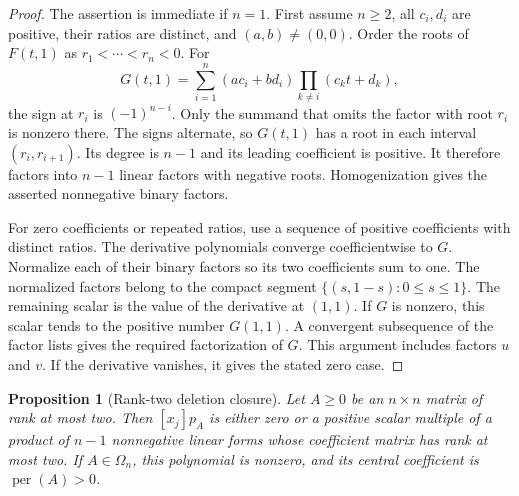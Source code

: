 \documentclass[11pt,a4paper]{article}
\newtheorem{proposition}[theorem]{Proposition}
\theoremstyle{definition}
\theoremstyle{remark}
\newcommand{\per}{\operatorname{per}}
\begin{document}
\begin{proof}
The assertion is immediate if $n=1$.
First assume $n\ge2$, all $c_i,d_i$ are positive, their ratios are distinct, and $(a,b)\ne(0,0)$.
Order the roots of $F(t,1)$ as $r_1<\cdots<r_n<0$.
For
\[
 G(t,1)=\sum_{i=1}^n(ac_i+bd_i)\prod_{k\ne i}(c_k t+d_k),
\]
the sign at $r_i$ is $(-1)^{n-i}$.
Only the summand that omits the factor with root $r_i$ is nonzero there.
The signs alternate, so $G(t,1)$ has a root in each interval $(r_i,r_{i+1})$.
Its degree is $n-1$ and its leading coefficient is positive.
It therefore factors into $n-1$ linear factors with negative roots.
Homogenization gives the asserted nonnegative binary factors.

For zero coefficients or repeated ratios, use a sequence of positive coefficients with distinct ratios.
The derivative polynomials converge coefficientwise to $G$.
Normalize each of their binary factors so its two coefficients sum to one.
The normalized factors belong to the compact segment
$\{(s,1-s):0\le s\le1\}$.
The remaining scalar is the value of the derivative at $(1,1)$.
If $G$ is nonzero, this scalar tends to the positive number $G(1,1)$.
A convergent subsequence of the factor lists gives the required factorization of $G$.
This argument includes factors $u$ and $v$.
If the derivative vanishes, it gives the stated zero case.
\end{proof}

\begin{proposition}[Rank-two deletion closure]\label{prop:r2-deletion-closure}
Let $A\ge0$ be an $n\times n$ matrix of rank at most two.
Then $[x_j]p_A$ is either zero or a positive scalar multiple of a product of $n-1$ nonnegative linear forms whose coefficient matrix has rank at most two.
If $A\in\Omega_n$, this polynomial is nonzero, and its central coefficient is $\per(A)>0$.
\end{proposition}
\end{document}
